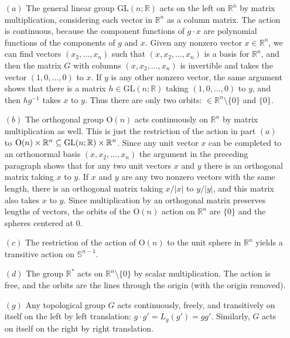 \begin{example}\label{group action eg}
\mbox{}
\begin{itemize}
\item[$(a)$]The general linear group $\mathrm{GL}(n;\mathbb{R})$ acts on the left on $\mathbb{R}^n$ by matrix multiplication, considering each vector in $\mathbb{R}^n$ as a column matrix. The action is continuous, because the component functions of $g\cdot x$ are polynomial functions of the
components of $g$ and $x$. Given any nonzero vector $x\in\mathbb{R}^n$, we can find vectors $(x_2,\dots,x_n)$ such that $(x,x_2,\dots,x_n)$ is a basis for $\mathbb{R}^n$, and then the matrix $G$ with columns $(x,x_2,\dots,x_n)$ is invertible and takes the vector $(1,0,\dots,0)$ to $x$. If $y$ is any other nonzero vector, the same argument shows that there is a matrix $h\in\mathrm{GL}(n;\mathbb{R})$ taking $(1,0,\dots,0)$ to $y$, and then $hg^{-1}$ takes $x$ to $y$. Thus there are only two orbits: $\in\mathbb{R}^n\setminus\{0\}$ and $\{0\}$.
\item[$(b)$]The orthogonal group $\mathrm{O}(n)$ acts continuously on $\mathbb{R}^n$ by matrix multiplication as well. This is just the restriction of the action in part $(a)$ to $\mathrm{O}(n)\times\mathbb{R}^n\subseteq \mathrm{GL}(n;\mathbb{R})\times\mathbb{R}^n$. Since any unit vector $x$ can be completed to an orthonormal basis $(x,x_2,\dots,x_n)$ the argument in the preceding paragraph shows that for any two unit vectors $x$ and $y$ there is an orthogonal matrix taking $x$ to $y$. If $x$ and $y$ are any two nonzero vectors with the same length, there is an orthogonal matrix taking $x/|x|$ to $y/|y|$, and this matrix also takes $x$ to $y$. Since multiplication by an orthogonal matrix preserves lengths of vectors, the orbits of the $\mathrm{O}(n)$ action on $\mathbb{R}^n$ are $\{0\}$ and the spheres centered at $0$.
\item[$(c)$]The restriction of the action of $\mathrm{O}(n)$ to the unit sphere in $\mathbb{R}^n$ yields a transitive
action on $\mathbb{S}^{n-1}$.
\item[$(d)$]The group $\mathbb{R}^*$ acts on $\mathbb{R}^n\setminus\{0\}$  by scalar multiplication. The action is free, and the orbits are the lines through the origin (with the origin removed).
\item[$(g)$]Any topological group $G$ acts continuously, freely, and transitively on itself on
the left by left translation: $g\cdot g'=L_g(g')=gg'$. Similarly, $G$ acts on itself on the right by right translation.

\end{itemize}
\end{example}
